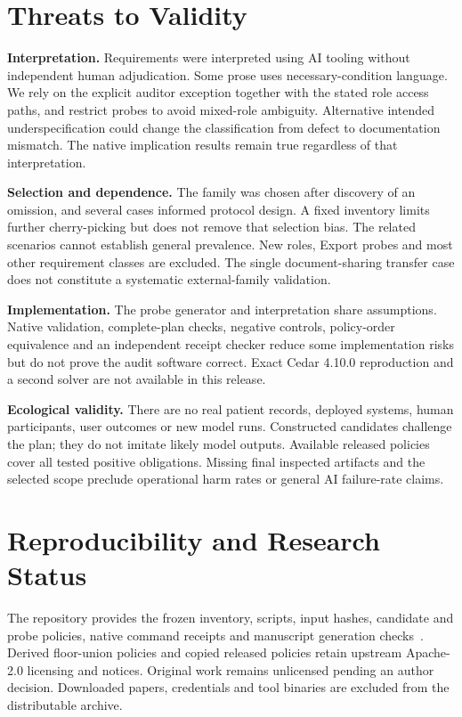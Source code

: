 \documentclass[sigconf,nonacm]{acmart}
\begin{document}
\section{Threats to Validity}
\textbf{Interpretation.} Requirements were interpreted using AI tooling without independent human adjudication. Some prose uses necessary-condition language. We rely on the explicit auditor exception together with the stated role access paths, and restrict probes to avoid mixed-role ambiguity. Alternative intended underspecification could change the classification from defect to documentation mismatch. The native implication results remain true regardless of that interpretation.

\textbf{Selection and dependence.} The family was chosen after discovery of an omission, and several cases informed protocol design. A fixed inventory limits further cherry-picking but does not remove that selection bias. The related scenarios cannot establish general prevalence. New roles, Export probes and most other requirement classes are excluded. The single document-sharing transfer case does not constitute a systematic external-family validation.

\textbf{Implementation.} The probe generator and interpretation share assumptions. Native validation, complete-plan checks, negative controls, policy-order equivalence and an independent receipt checker reduce some implementation risks but do not prove the audit software correct. Exact Cedar 4.10.0 reproduction and a second solver are not available in this release.

\textbf{Ecological validity.} There are no real patient records, deployed systems, human participants, user outcomes or new model runs. Constructed candidates challenge the plan; they do not imitate likely model outputs. Available released policies cover all tested positive obligations. Missing final inspected artifacts and the selected scope preclude operational harm rates or general AI failure-rate claims.

\balance
\section{Reproducibility and Research Status}
The repository provides the frozen inventory, scripts, input hashes, candidate and probe policies, native command receipts and manuscript generation checks~\cite{ours}. Derived floor-union policies and copied released policies retain upstream Apache-2.0 licensing and notices. Original work remains unlicensed pending an author decision. Downloaded papers, credentials and tool binaries are excluded from the distributable archive.
\end{document}
